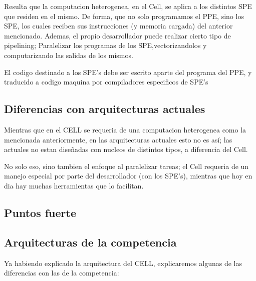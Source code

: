 \documentclass[10pt,compsoc]{IEEEtran}
\begin{document}
	 Resulta que la computacion heterogenea, en el Cell, se aplica a los distintos SPE que residen en el mismo. De forma, que no solo programamos el PPE, sino los SPE, los cuales reciben sus instrucciones (y memoria cargada) del anterior mencionado. Ademas, el propio desarrollador puede realizar cierto tipo de pipelining; Paralelizar los programas de los SPE,vectorizandolos y computarizando las salidas de los mismos.\newline
	 
	 El codigo destinado a los SPE's debe ser escrito aparte del programa del PPE, y traducido a codigo maquina por compiladores especificos de SPE's
	
	\subsection{Diferencias con arquitecturas actuales}
	\noindent Mientras que en el CELL se requeria de una computacion heterogenea como la mencionada anteriormente, en las arquitecturas actuales esto no es así; las actuales no estan diseñadas con nucleos de distintos tipos, a diferencia del Cell.
	
	No solo eso, sino tambien el enfoque al paralelizar tareas; el Cell requeria de un manejo especial por parte del desarrollador (con los SPE's), mientras que hoy en dia hay muchas herramientas que lo facilitan.
	
	\subsection{Puntos fuerte}
	\noindent
	
	\subsection{Arquitecturas de la competencia}%
	\noindent Ya habiendo explicado la arquitectura del CELL, explicaremos algunas de las diferencias con las de la competencia:
	
\end{document}
